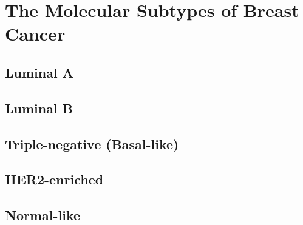 \section{The Molecular Subtypes of Breast Cancer}
\subsection{Luminal A}
\subsection{Luminal B}
\subsection{Triple-negative (Basal-like)}
\subsection{HER2-enriched}
\subsection{Normal-like}